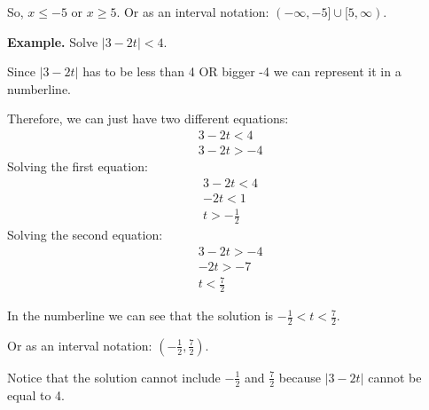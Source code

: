 So, $x\leq-5$ or $x\geq5$. Or as an interval notation: $(-\infty, -5]\cup[5, \infty)$.

\textbf{Example.} Solve $|3-2t|<4$. 

Since $|3-2t|$ has to be less than 4 OR bigger -4 we can represent it in a numberline.  \\

Therefore, we can just have two different equations: 
\begin{align*}
    3-2t<4 \\
    3-2t>-4
\end{align*}
Solving the first equation:
\begin{align*}
    3-2t<4 \\
    -2t<1 \\
    t>-\frac{1}{2}
\end{align*}
Solving the second equation:
\begin{align*}
    3-2t>-4 \\
    -2t>-7 \\
    t<\frac{7}{2}
\end{align*}

In the numberline we can see that the solution is $-\frac{1}{2}<t<\frac{7}{2}$. \\

Or as an interval notation: $(-\frac{1}{2}, \frac{7}{2})$.

Notice that the solution cannot include $-\frac{1}{2}$ and $\frac{7}{2}$ because $|3-2t|$ cannot be equal to 4.